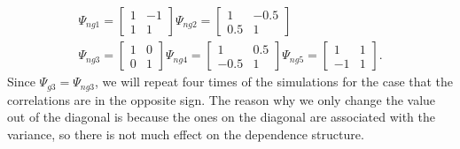 \documentclass[mstat,12pt]{unswthesis}  %
\numberwithin{equation}{section}
\begin{document}
\begin{equation}
\begin{split}
\Psi_{ng1}=\left[\begin{array}{ll}
1 & -1 \\
1 & 1
\end{array}\right] \Psi_{ng2}=\left[\begin{array}{ll}
1 & -0.5 \\
0.5 & 1
\end{array}\right]\\ \Psi_{ng3}=\left[\begin{array}{ll}
1 & 0 \\
0 & 1
\end{array}\right] \Psi_{ng4}=\left[\begin{array}{ll}
1 & 0.5 \\
-0.5 & 1
\end{array}\right] \Psi_{ng5}=\left[\begin{array}{ll}
1 & 1 \\
-1 & 1
\end{array}\right].
\end{split}
\end{equation}
Since $\Psi_{g3} = \Psi_{ng3}$, we will repeat four times of the simulations for the case that the correlations are in the opposite sign. The reason why we only change the value out of the diagonal is because the ones on the diagonal are associated with the variance, so there is not much effect on the dependence structure. 
\end{document}
